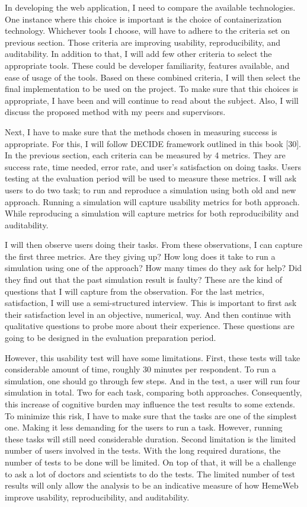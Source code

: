 \documentclass[]{article}
\begin{document}
In developing the web application, I need to compare the available
technologies. One instance where this choice is important is the choice
of containerization technology. Whichever tools I choose, will have to
adhere to the criteria set on previous section. Those criteria are
improving usability, reproducibility, and auditability. In addition to
that, I will add few other criteria to select the appropriate tools.
These could be developer familiarity, features available, and ease of
usage of the tools. Based on these combined criteria, I will then select
the final implementation to be used on the project. To make sure that
this choices is appropriate, I have been and will continue to read about
the subject. Also, I will discuss the proposed method with my peers and
supervisors.

Next, I have to make sure that the methods chosen in measuring success
is appropriate. For this, I will follow DECIDE framework outlined in
this book {[}30{]}. In the previous section, each criteria can be
measured by 4 metrics. They are success rate, time needed, error rate,
and user's satisfaction on doing tasks. Users testing at the evaluation
period will be used to measure these metrics. I will ask users to do two
task; to run and reproduce a simulation using both old and new approach.
Running a simulation will capture usability metrics for both approach.
While reproducing a simulation will capture metrics for both
reproducibility and auditability.

I will then observe users doing their tasks. From these observations, I
can capture the first three metrics. Are they giving up? How long does
it take to run a simulation using one of the approach? How many times do
they ask for help? Did they find out that the past simulation result is
faulty? These are the kind of questions that I will capture from the
observation. For the last metrics, satisfaction, I will use a
semi-structured interview. This is important to first ask their
satisfaction level in an objective, numerical, way. And then continue
with qualitative questions to probe more about their experience. These
questions are going to be designed in the evaluation preparation period.

However, this usability test will have some limitations. First, these
tests will take considerable amount of time, roughly 30 minutes per
respondent. To run a simulation, one should go through few steps. And in
the test, a user will run four simulation in total. Two for each task,
comparing both approaches. Consequently, this increase of cognitive
burden may influence the test results to some extends. To minimize this
risk, I have to make sure that the tasks are one of the simplest one.
Making it less demanding for the users to run a task. However, running
these tasks will still need considerable duration. Second limitation is
the limited number of users involved in the tests. With the long
required durations, the number of tests to be done will be limited. On
top of that, it will be a challenge to ask a lot of doctors and
scientists to do the tests. The limited number of test results will only
allow the analysis to be an indicative measure of how HemeWeb improve
usability, reproducibility, and auditability.
\end{document}
